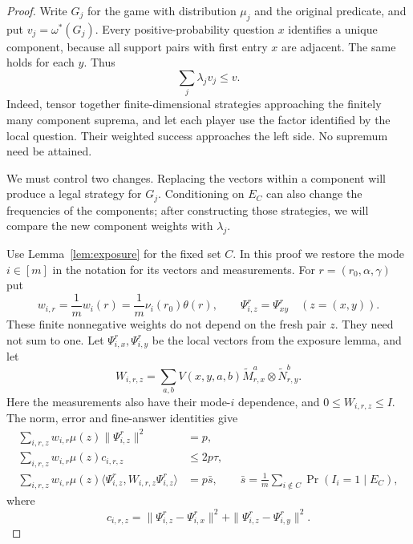 \begin{proof}
Write $G_j$ for the game with distribution $\mu_j$ and the original
predicate, and put $v_j=\omega^*(G_j)$. Every positive-probability
question $x$ identifies a unique component, because all support pairs
with first entry $x$ are adjacent. The same holds for each $y$. Thus
\begin{equation}\label{eq:root-component-values}
 \sum_j\lambda_jv_j\le v.
\end{equation}
Indeed, tensor together finite-dimensional strategies approaching the
finitely many component suprema, and let each player use the factor
identified by the local question. Their weighted success approaches
the left side. No supremum need be attained.

We must control two changes. Replacing the vectors within a component
will produce a legal strategy for $G_j$. Conditioning on $E_C$ can also
change the frequencies of the components; after constructing those
strategies, we will compare the new component weights with $\lambda_j$.

Use Lemma~\ref{lem:exposure} for the fixed set $C$. In this proof we
restore the mode $i\in[m]$ in the notation for its vectors and
measurements. For $r=(r_0,\alpha,\gamma)$ put
\[
 w_{i,r}=\frac1m w_i(r)=\frac1m\nu_i(r_0)\theta(r),\qquad
 \Psi_{i,z}^r=\Psi_{xy}^r\quad(z=(x,y)).
\]
These finite nonnegative weights do not depend on the fresh pair $z$.
They need not sum to one. Let $\Psi_{i,x}^r,\Psi_{i,y}^r$ be the local
vectors from the exposure lemma, and let
\[
 W_{i,r,z}=\sum_{a,b}V(x,y,a,b)
               \widetilde M_{r,x}^a\otimes\widetilde N_{r,y}^b.
\]
Here the measurements also have their mode-$i$ dependence, and
$0\le W_{i,r,z}\le I$. The norm, error and fine-answer identities give
\begin{align}
 \sum_{i,r,z}w_{i,r}\mu(z)\|\Psi_{i,z}^r\|^2&=p,
          \label{eq:root-input-mass}\\
 \sum_{i,r,z}w_{i,r}\mu(z)c_{i,r,z}&\le2p\tau,
          \label{eq:root-input-error}\\
 \sum_{i,r,z}w_{i,r}\mu(z)
       \langle\Psi_{i,z}^r,W_{i,r,z}\Psi_{i,z}^r\rangle
     &=p\bar s,\qquad
 \bar s=\frac1m\sum_{i\notin C}\Pr(I_i=1\mid E_C),
          \label{eq:root-input-win}
\end{align}
where
\[
 c_{i,r,z}=\|\Psi_{i,z}^r-\Psi_{i,x}^r\|^2
               +\|\Psi_{i,z}^r-\Psi_{i,y}^r\|^2.
\]


\end{proof}
